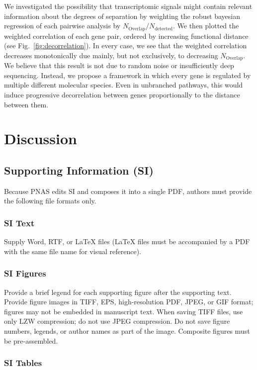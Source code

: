 \documentclass[9pt,twocolumn,twoside]{pnas-new}
\begin{document}
We investigated the possibility that transcriptomic signals might contain relevant information about the degrees of separation by weighting the robust bayesian regression of each pairwise analysis by $N_\mathrm{Overlap}/N_{\mathrm{detected}}$. We then plotted the weighted correlation of each gene pair, ordered by increasing functional distance (see Fig.~\ref{fig:decorrelation}). In every case, we see that the weighted correlation decreases monotonically due mainly, but not exclusively, to decreasing $N_\mathrm{Overlap}$.
We believe that this result is not due to random noise or insufficiently deep sequencing. Instead, we propose a framework in which every gene is regulated by multiple different molecular species. Even in unbranched pathways, this would induce progressive decorrelation between genes proportionally to the distance between them.

\section*{Discussion}


\subsection*{Supporting Information (SI)}
Because PNAS edits SI and composes it into a single PDF, authors must provide the following file formats only.

\subsubsection*{SI Text}

Supply Word, RTF, or LaTeX files (LaTeX files must be accompanied by a PDF with the same file name for visual reference).

\subsubsection*{SI Figures}

Provide a brief legend for each supporting figure after the supporting text. Provide figure images in TIFF, EPS, high-resolution PDF, JPEG, or GIF format; figures may not be embedded in manuscript text. When saving TIFF files, use only LZW compression; do not use JPEG compression. Do not save figure numbers, legends, or author names as part of the image. Composite figures must be pre-assembled.

\subsubsection*{SI Tables}
\end{document}
